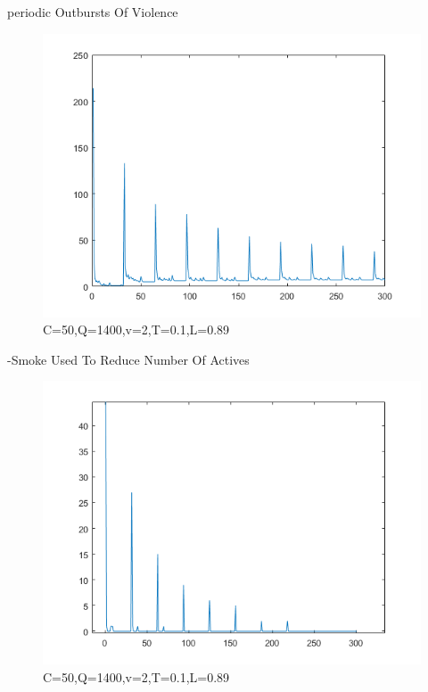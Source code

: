 \documentclass[final,hyperref={pdfpagelabels=false}]{beamer}
\begin{document}
\begin{frame}[t]
\begin{columns}[t]
\begin{column}{.3\textwidth}
\begin{block}{periodic Outbursts Of Violence}
					\begin{figure}[H]
						\includegraphics[width=\linewidth]{Outbursts_of_violence.png}
						\caption{C=50,Q=1400,v=2,T=0.1,L=0.89}
						\label{fig:yu}
					\end{figure}
					-Smoke Used To Reduce Number Of Actives
					\begin{figure}[H]
						\includegraphics[width=\linewidth]{Smokes_affect_on_Outbursts.png}
						\caption{C=50,Q=1400,v=2,T=0.1,L=0.89}
						\label{fig:yu}
					\end{figure}
			\end{block}
					
				\end{column}
					
			\end{columns} %
		\end{frame} %
		
	
\end{document}
